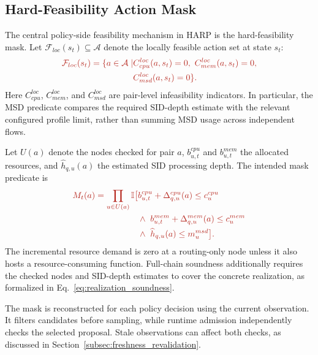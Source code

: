 \documentclass[final,5p]{elsarticle}
\newcommand{\rev}[1]{\textcolor{BrickRed}{#1}}
\begin{document}
\subsection{Hard-Feasibility Action Mask}
\label{subsec:harp_masking}

The central \rev{policy-side feasibility mechanism} in HARP is the hard-feasibility mask. Let \(\mathcal{F}_{loc}(s_t)\subseteq\mathcal{A}\) denote the \rev{locally feasible} action set at state \(s_t\):
\begin{equation}
\rev{\begin{aligned}
\mathcal{F}_{loc}(s_t)=\{a\in\mathcal A\mid
&C_{cpu}^{loc}(a,s_t)=0,\ C_{mem}^{loc}(a,s_t)=0,\\
&C_{msd}^{loc}(a,s_t)=0\}.
\end{aligned}}
\label{eq:feasible_set}
\end{equation}
Here \(C_{cpu}^{loc}\), \(C_{mem}^{loc}\), and \(C_{msd}^{loc}\) are \rev{pair-level infeasibility indicators}. In particular, \rev{the MSD predicate compares the required SID-depth estimate with the relevant configured profile limit, rather than summing MSD usage across independent flows}.

\rev{Let \(U(a)\) denote the nodes checked for pair \(a\), \(b_{u,t}^{cpu}\) and \(b_{u,t}^{mem}\) the allocated resources, and \(\widehat h_{q,u}(a)\) the estimated SID processing depth. The intended mask predicate is}
\begin{equation}
\rev{\begin{aligned}
M_t(a)=\prod_{u\in U(a)}\mathbb I\big[
&b_{u,t}^{cpu}+\Delta_{q,u}^{cpu}(a)\le c_u^{cpu}\\
&\land\ b_{u,t}^{mem}+\Delta_{q,u}^{mem}(a)\le c_u^{mem}\\
&\land\ \widehat h_{q,u}(a)\le m_u^{msd}\big].
\end{aligned}}
\label{eq:runtime_pair_mask}
\end{equation}
\rev{The incremental resource demand is zero at a routing-only node unless it also hosts a resource-consuming function. Full-chain soundness additionally requires the checked nodes and SID-depth estimates to cover the concrete realization, as formalized in Eq.~\eqref{eq:realization_soundness}.}

\rev{The mask is reconstructed for each policy decision using the current observation. It filters candidates before sampling, while runtime admission independently checks the selected proposal. Stale observations can affect both checks, as discussed in Section~\ref{subsec:freshness_revalidation}.}
\end{document}

